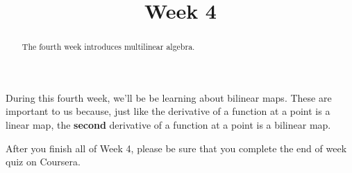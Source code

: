 \documentclass{ximera}
\title{Week 4}
\begin{document}
\begin{abstract}
  The fourth week introduces multilinear algebra.
\end{abstract}\maketitle

During this fourth week, we'll be be learning about bilinear maps.  These are important to us because, just like the derivative
of a function at a point is a linear map, the \textbf{second} derivative of a function at a point is a bilinear map.

After you finish all of Week 4, please be sure that you complete the
end of week quiz on Coursera.
\end{document}
